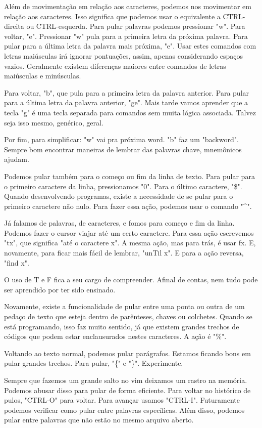 \documentclass[a4paper, 12pt]{article}
\begin{document}
Além de movimentação em relação aos caracteres, podemos nos movimentar em relação aos caracteres.
Isso significa que podemos usar o equivalente a CTRL-direita ou CTRL-esquerda.
Para pular palavras podemos pressionar "w". Para voltar, "e".
Pressionar "w" pula para a primeira letra da próxima palavra.
Para pular para a última letra da palavra mais próxima, "e".
Usar estes comandos com letras maiúsculas irá ignorar pontuações, assim, apenas considerando espaços vazios.
Geralmente existem diferenças maiores entre comandos de letras maiúsculas e minúsculas.

Para voltar, "b", que pula para a primeira letra da palavra anterior.
Para pular para a última letra da palavra anterior, "ge".
Mais tarde vamos aprender que a tecla "g" é uma tecla separada para comandos sem muita lógica associada.
Talvez seja isso mesmo, genérico, geral.

Por fim, para simplificar: "w" vai pra próxima word. "b" faz um "backword".
Sempre bom encontrar maneiras de lembrar das palavras chave, mnemônicos ajudam.

Podemos pular também para o começo ou fim da linha de texto.
Para pular para o primeiro caractere da linha, pressionamos "0".
Para o último caractere, "\$".
Quando desenvolvendo programas, existe a necessidade de se pular para o primeiro caractere não nulo.
Para fazer essa ação, podemos usar o comando "\textbf{\^}".

Já falamos de palavras, de caracteres, e fomos para começo e fim da linha.
Podemos fazer o cursor viajar até um certo caractere.
Para essa ação escrevemos "tx", que significa "até o caractere x".
A mesma ação, mas para trás, é usar fx.
E, novamente, para ficar mais fácil de lembrar, "unTil x".
E para a ação reversa, "find x".

O uso de T e F fica a seu cargo de compreender.
Afinal de contas, nem tudo pode ser aprendido por ter sido ensinado.

Novamente, existe a funcionalidade de pular entre uma ponta ou outra de um pedaço de texto que esteja dentro de parênteses, chaves ou colchetes.
Quando se está programando, isso faz muito sentido, já que existem grandes trechos de códigos que podem estar enclausurados nestes caracteres.
A ação é "\%".

Voltando ao texto normal, podemos pular parágrafos.
Estamos ficando bons em pular grandes trechos.
Para pular, "\{" e "\}". Experimente.

Sempre que fazemos um grande salto no vim deixamos um rastro na memória.
Podemos abusar disso para pular de forma eficiente.
Para voltar no histórico de pulos, "CTRL-O" para voltar.
Para avançar usamos "CTRL-I".
Futuramente podemos verificar como pular entre palavras específicas.
Além disso, podemos pular entre palavras que não estão no mesmo arquivo aberto.
\end{document}
